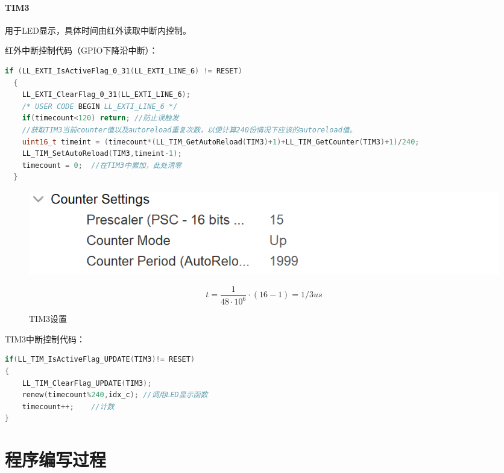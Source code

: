 \documentclass{article}
\begin{document}
\paragraph{TIM3}用于LED显示，具体时间由红外读取中断内控制。\par
红外中断控制代码（GPIO下降沿中断）：\par
\begin{multicols}{2}
\begin{lstlisting}[language=c]
if (LL_EXTI_IsActiveFlag_0_31(LL_EXTI_LINE_6) != RESET)
  {
    LL_EXTI_ClearFlag_0_31(LL_EXTI_LINE_6);
    /* USER CODE BEGIN LL_EXTI_LINE_6 */
    if(timecount<120) return; //防止误触发
    //获取TIM3当前counter值以及autoreload重复次数，以便计算240份情况下应该的autoreload值。
    uint16_t timeint = (timecount*(LL_TIM_GetAutoReload(TIM3)+1)+LL_TIM_GetCounter(TIM3)+1)/240;
	LL_TIM_SetAutoReload(TIM3,timeint-1);
    timecount = 0;  //在TIM3中累加，此处清零
  }
\end{lstlisting}
\end{multicols}
\begin{figure}[H]
    \begin{minipage}{0.5\textwidth}
        \centering
        \includegraphics[width=0.9\linewidth]{assets/10.png}
        \caption{TIM3设置}
    \end{minipage}
    \begin{minipage}{0.49\textwidth}
        $$
        t=\frac1{48\cdot10^6}\cdot(16-1)=1/3us
        $$
    \end{minipage}
\end{figure}
TIM3中断控制代码：\par
\begin{lstlisting}[language=c]
if(LL_TIM_IsActiveFlag_UPDATE(TIM3)!= RESET)
{
    LL_TIM_ClearFlag_UPDATE(TIM3);
    renew(timecount%240,idx_c); //调用LED显示函数
    timecount++;    //计数
}
\end{lstlisting}
\section{程序编写过程}
\end{document}
